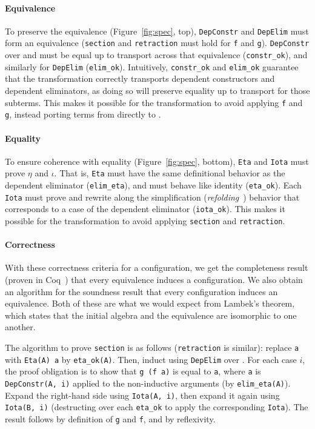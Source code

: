 \paragraph{Equivalence}
To preserve the equivalence (Figure~\ref{fig:spec}, top), \lstinline{DepConstr} and \lstinline{DepElim} must form an equivalence
(\lstinline{section} and \lstinline{retraction} must hold for \lstinline{f} and \lstinline{g}).
\lstinline{DepConstr} over \Aa and \B must be equal up to transport across that equivalence (\lstinline{constr_ok}), 
and similarly for \lstinline{DepElim} (\lstinline{elim_ok}).
Intuitively, \lstinline{constr_ok} and \lstinline{elim_ok} guarantee that the transformation
correctly transports dependent constructors and dependent eliminators,
as doing so will preserve equality up to transport for those subterms.
This makes it possible for the transformation
to avoid applying \lstinline{f} and \lstinline{g}, instead porting terms from \Aa directly to \B.

\paragraph{Equality}
To ensure coherence with equality (Figure~\ref{fig:spec}, bottom),
\lstinline{Eta} and \lstinline{Iota} must prove $\eta$ and $\iota$.
That is, \lstinline{Eta} must have the same definitional behavior as the dependent eliminator (\lstinline{elim_eta}),
and must behave like identity (\lstinline{eta_ok}).
Each \lstinline{Iota} must prove and rewrite along the simplification (\textit{refolding}~\cite{boutillier:tel-01054723}) behavior that corresponds to a case of the dependent eliminator (\lstinline{iota_ok}).
This makes it possible for the transformation to
avoid applying \lstinline{section} and \lstinline{retraction}.

\paragraph{Correctness}
With these correctness criteria for a configuration, we get the completeness result (proven in Coq~\href{https://github.com/uwplse/pumpkin-pi/blob/v2.0.0/plugin/coq/playground/arbitrary.v}{}) that every equivalence induces a configuration. %
We also obtain an algorithm for the soundness result that every configuration induces an equivalence.
Both of these are what we would expect from Lambek's theorem, which states that the initial algebra and the equivalence are isomorphic to one another.

The algorithm to prove \lstinline{section} is as follows (\lstinline{retraction} is similar):
replace \lstinline{a} with \lstinline{Eta(A) a} by \lstinline{eta_ok(A)}.
Then, induct using \lstinline{DepElim} over \Aa.
For each case $i$, the proof obligation is to show that \lstinline{g (f a)} is equal to \lstinline{a},
where \lstinline{a} is \lstinline{DepConstr(A, i)} applied to the non-inductive arguments (by \lstinline{elim_eta(A)}).
Expand the right-hand side using \lstinline{Iota(A, i)}, then expand it again using \lstinline{Iota(B, i)}
(destructing over each \lstinline{eta_ok} to apply the corresponding \lstinline{Iota}).
The result follows by definition of \lstinline{g} and \lstinline{f}, and by reflexivity.


